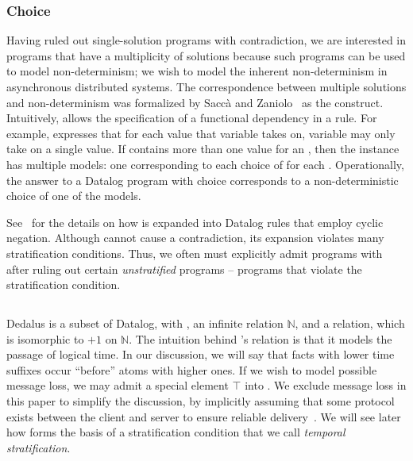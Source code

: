 \subsubsection{Choice}

Having ruled out single-solution programs with contradiction, we are interested
in programs that have a multiplicity of solutions because such programs can be
used to model non-determinism; we wish to model the inherent non-determinism in
asynchronous distributed systems.  The correspondence between multiple
solutions and non-determinism was formalized by Sacc\`{a} and
Zaniolo~\cite{sacca-zaniolo} as the  construct.  Intuitively,
 allows the specification of a functional dependency in a rule.
For example,  expresses that for
each value that variable  takes on, variable  may only
take on a single value.  If  contains more than one 
value for an , then the instance has multiple models: one
corresponding to each choice of  for each .
Operationally, the answer to a Datalog program with choice corresponds to a
non-deterministic choice of one of the models.

See~\cite{sacca-zaniolo} for the details on how  is expanded
into Datalog rules that employ cyclic negation.  Although 
cannot cause a contradiction, its expansion violates many stratification
conditions.  Thus, we often must explicitly admit programs with
 after ruling out certain {\em unstratified} programs --
programs that violate the stratification condition.

\subsection{\lang}

Dedalus is a subset of Datalog, with , an infinite
 relation $\mathbb{N}$, and a 
relation, which is isomorphic to $+1$ on $\mathbb{N}$.  The intuition behind
\lang's  relation is that it models the passage of logical
time.  In our discussion, we will say that facts with lower time suffixes occur
``before'' atoms with higher ones.  If we wish to model possible message loss,
we may admit a special element $\top$ into .  We exclude message
loss in this paper to simplify the discussion, by implicitly assuming that some
protocol exists between the client and server to ensure reliable delivery~\cite{dedalus-techr, netdb}.
We will see later how  forms the basis of a stratification
condition that we call {\em temporal stratification}.


